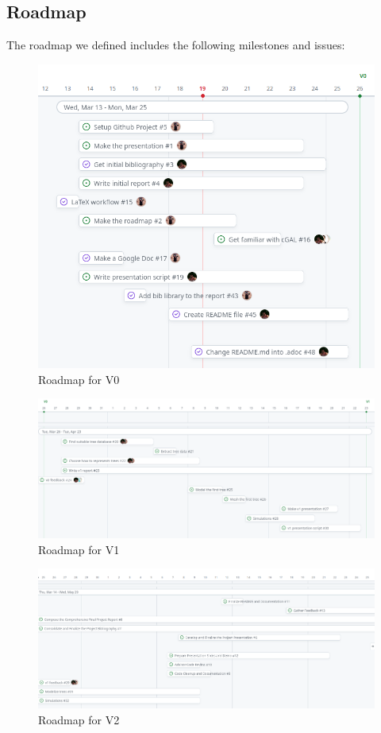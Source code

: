 \documentclass[12pt]{article}
\begin{document}
\subsection{Roadmap}
The roadmap we defined includes the following milestones and issues:

\begin{figure}[H]
    \centering
    \includegraphics[width=1\textwidth]{images/roadmap_v0.png}
    \caption{Roadmap for V0}
\end{figure}

\begin{figure}[H]
    \centering
    \includegraphics[width=1\textwidth]{images/roadmap_v1.png}
    \caption{Roadmap for V1}
\end{figure}

\begin{figure}[H]
    \centering
    \includegraphics[width=1\textwidth]{images/roadmap_v2.png}
    \caption{Roadmap for V2}
\end{figure}
\end{document}
